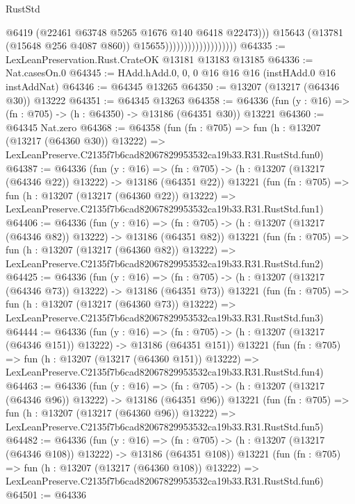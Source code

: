 \begin{lexlean}{RustStd}
\begin{coremodule}
                                              @6419
                                              (@22461 @63748 @5265 @1676 @140 @6418 @22473)))
                                          @15643
                                          (@13781 (@15648 @256 @4087 @860))
                                          @15655)))))))))))))))))))
@64335 := LexLeanPreservation.Rust.CrateOK @13181 @13183 @13185
@64336 := Nat.casesOn.{0}
@64345 := HAdd.hAdd.{0, 0, 0} @16 @16 @16 (instHAdd.{0} @16 instAddNat)
@64346 := @64345 @13265
@64350 := @13207 (@13217 (@64346 @30)) @13222
@64351 := @64345 @13263
@64358 := @64336 (fun (y : @16) => (fn : @705) -> (h : @64350) -> @13186 (@64351 @30)) @13221
@64360 := @64345 Nat.zero
@64368 := @64358
    (fun (fn : @705) =>
    fun (h : @13207 (@13217 (@64360 @30)) @13222) =>
    LexLeanPreserve.C2135f7b6cad82067829953532ca19b33.R31.RustStd.fun0)
@64387 := @64336
    (fun (y : @16) =>
    (fn : @705) -> (h : @13207 (@13217 (@64346 @22)) @13222) -> @13186 (@64351 @22))
    @13221
    (fun (fn : @705) =>
    fun (h : @13207 (@13217 (@64360 @22)) @13222) =>
    LexLeanPreserve.C2135f7b6cad82067829953532ca19b33.R31.RustStd.fun1)
@64406 := @64336
    (fun (y : @16) =>
    (fn : @705) -> (h : @13207 (@13217 (@64346 @82)) @13222) -> @13186 (@64351 @82))
    @13221
    (fun (fn : @705) =>
    fun (h : @13207 (@13217 (@64360 @82)) @13222) =>
    LexLeanPreserve.C2135f7b6cad82067829953532ca19b33.R31.RustStd.fun2)
@64425 := @64336
    (fun (y : @16) =>
    (fn : @705) -> (h : @13207 (@13217 (@64346 @73)) @13222) -> @13186 (@64351 @73))
    @13221
    (fun (fn : @705) =>
    fun (h : @13207 (@13217 (@64360 @73)) @13222) =>
    LexLeanPreserve.C2135f7b6cad82067829953532ca19b33.R31.RustStd.fun3)
@64444 := @64336
    (fun (y : @16) =>
    (fn : @705) -> (h : @13207 (@13217 (@64346 @151)) @13222) -> @13186 (@64351 @151))
    @13221
    (fun (fn : @705) =>
    fun (h : @13207 (@13217 (@64360 @151)) @13222) =>
    LexLeanPreserve.C2135f7b6cad82067829953532ca19b33.R31.RustStd.fun4)
@64463 := @64336
    (fun (y : @16) =>
    (fn : @705) -> (h : @13207 (@13217 (@64346 @96)) @13222) -> @13186 (@64351 @96))
    @13221
    (fun (fn : @705) =>
    fun (h : @13207 (@13217 (@64360 @96)) @13222) =>
    LexLeanPreserve.C2135f7b6cad82067829953532ca19b33.R31.RustStd.fun5)
@64482 := @64336
    (fun (y : @16) =>
    (fn : @705) -> (h : @13207 (@13217 (@64346 @108)) @13222) -> @13186 (@64351 @108))
    @13221
    (fun (fn : @705) =>
    fun (h : @13207 (@13217 (@64360 @108)) @13222) =>
    LexLeanPreserve.C2135f7b6cad82067829953532ca19b33.R31.RustStd.fun6)
@64501 := @64336

\end{coremodule}
\end{lexlean}
